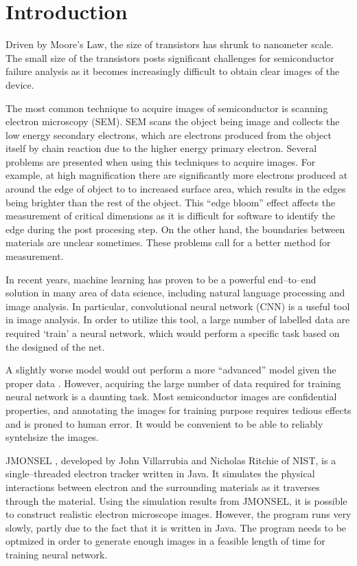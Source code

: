 \chapter{Introduction}
\pagestyle{fancy}
\fancyhead{}
\fancyhead[R]{\thepage}
\fancyfoot{}
\renewcommand{\headrulewidth}{0pt}
\renewcommand{\footrulewidth}{0pt}

\setcounter{page}{1}
Driven by Moore's Law, the size of transistors has shrunk to nanometer scale. The small size of the transistors posts significant challenges for semiconductor failure analysis as it becomes increasingly difficult to obtain clear images of the device.

The most common technique to acquire images of semiconductor is scanning electron microscopy (SEM). SEM scans the object being image and collects the low energy secondary electrons, which are electrons produced from the object itself by chain reaction due to the higher energy primary electron. Several problems are presented when using this techniques to acquire images. For example, at high magnification there are significantly more electrons produced at around the edge of object to to increased surface area, which results in the edges being brighter than the rest of the object. This ``edge bloom'' effect affects the measurement of critical dimensions as it is difficult for software to identify the edge during the post procesing step. On the other hand, the boundaries between materials are unclear sometimes. These problems call for a better method for measurement.

In recent years, machine learning has proven to be a powerful end--to--end solution in many area of data science, including natural language processing and image analysis. In particular, convolutional neural network (CNN) is a useful tool in image analysis. In order to utilize this tool, a large number of labelled data are required `train' a neural network, which would perform a specific task based on the designed of the net.

A slightly worse model would out perform a more ``advanced'' model given the proper data \cite{halevy2009unreasonable}. However, acquiring the large number of data required for training neural network is a daunting task. Most semiconductor images are confidential properties, and annotating the images for training purpose requires tedious effects and is proned to human error. It would be convenient to be able to reliably syntehsize the images. 

JMONSEL \cite{villarrubia2015scanning}, developed by John Villarrubia and Nicholas Ritchie of NIST, is a single--threaded electron tracker written in Java. It simulates the physical interactions between electron and the surrounding materials as it traverses through the material. Using the simulation results from JMONSEL, it is possible to construct realistic electron microscope images. However, the program runs very slowly, partly due to the fact that it is written in Java. The program needs to be optmized in order to generate enough images in a feasible length of time for training neural network.

